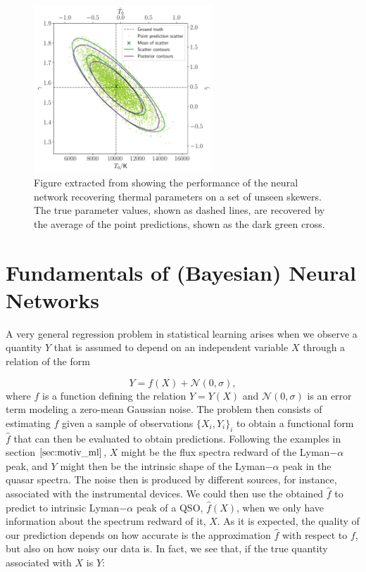 \begin{figure}
    \centering
    \includegraphics[width=0.6\textwidth]{img//ML/scatter__and__posterior_contours_fiducial_tdr.pdf}
    \caption{Figure extracted from \cite{lynna} showing the performance of the neural network recovering thermal parameters on a set of unseen skewers. The true parameter values, shown as dashed lines, are recovered by the average of the point predictions, shown as the dark green cross.}
    \label{fig:ML LYNNA}
\end{figure}

\section{Fundamentals of (Bayesian) Neural Networks}

A very general regression problem in statistical learning \cite{James2021} arises when we observe a quantity $Y$ that is assumed to depend on an independent variable $X$ through a relation of the form

\begin{equation}
    Y = f(X)+\mathcal{N}(0,\sigma),
\end{equation}
where $f$ is a function defining the relation $Y=Y(X)$ and $\mathcal{N}(0,\sigma)$ is an error term modeling a zero-mean Gaussian noise. The problem then consists of estimating $f$ given a sample of observations $\{ X_i, Y_i\}_i$ to obtain a functional form $\hat{f}$ that can then be evaluated to obtain predictions. Following the examples in section $\ref{sec:motiv_ml}$, $X$ might be the flux spectra redward of the Lyman$-\alpha$ peak, and $Y$ might then be the intrinsic shape of the Lyman$-\alpha$ peak in the quasar spectra. The noise then is produced by different sources, for instance, associated with the instrumental devices. We could then use the obtained $\hat{f}$ to predict to intrinsic Lyman$-\alpha$ peak of a QSO, $\hat{f}(X)$, when we only have information about the spectrum redward of it, $X$. As it is expected, the quality of our prediction depends on how accurate is the approximation $\hat{f}$ with respect to $f$, but also on how noisy our data is. In fact, we see that, if the true quantity associated with $X$ is $Y$:

